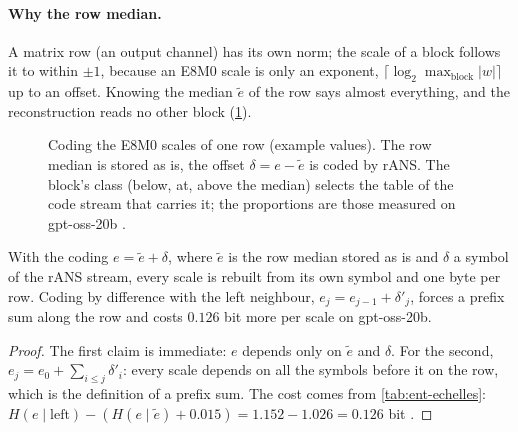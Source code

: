 \paragraph{Why the row median.} A matrix row (an output channel) has its own norm; the scale of a block follows it to within $\pm1$, because an E8M0 scale is only an exponent, $\lceil \log_2 \max_{\text{block}} |w| \rceil$ up to an offset. Knowing the median $\tilde e$ of the row says almost everything, and the reconstruction reads no other block (\cref{fig:ent-echelles-ligne}).

\begin{figure}[ht]
\centering
\resizebox{\linewidth}{!}{\SchemaEchellesLigne}
\caption[Coding the scales by the row median]{Coding the E8M0 scales of one row (example values). The row median is stored as is, the offset $\delta = e - \tilde e$ is coded by rANS. The block's class (below, at, above the median) selects the table of the code stream that carries it; the proportions are those measured on gpt-oss-20b \mes.}
\label{fig:ent-echelles-ligne}
\end{figure}

\begin{proposition}\label{prop:ent-locale}
With the coding $e = \tilde e + \delta$, where $\tilde e$ is the row median stored as is and $\delta$ a symbol of the rANS stream, every scale is rebuilt from its own symbol and one byte per row. Coding by difference with the left neighbour, $e_j = e_{j-1} + \delta'_j$, forces a prefix sum along the row and costs $0.126$ bit more per scale on gpt-oss-20b.
\end{proposition}

\begin{proof}
The first claim is immediate: $e$ depends only on $\tilde e$ and $\delta$. For the second, $e_j = e_0 + \sum_{i \le j} \delta'_i$: every scale depends on all the symbols before it on the row, which is the definition of a prefix sum. The cost comes from \cref{tab:ent-echelles}: $H(e \mid \text{left}) - (H(e \mid \tilde e) + 0.015) = 1.152 - 1.026 = 0.126$ bit \calc.
\end{proof}

